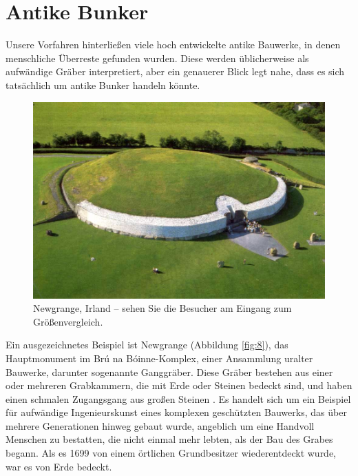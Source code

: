 \documentclass[10pt,twocolumn,letterpaper]{article}
\begin{document}
\section{Antike Bunker}

Unsere Vorfahren hinterließen viele hoch entwickelte antike Bauwerke, in denen menschliche Überreste gefunden wurden. Diese werden üblicherweise als aufwändige Gräber interpretiert, aber ein genauerer Blick legt nahe, dass es sich tatsächlich um antike Bunker handeln könnte.

\begin{figure}[b]
\begin{center}
   \includegraphics[width=1\linewidth]{ww19.jpg}
\end{center}
   \caption{Newgrange, Irland – sehen Sie die Besucher am Eingang zum Größenvergleich.}
\label{fig:8}
\label{fig:onecol}
\end{figure}

Ein ausgezeichnetes Beispiel ist Newgrange (Abbildung \ref{fig:8}), das Hauptmonument im Brú na Bóinne-Komplex, einer Ansammlung uralter Bauwerke, darunter sogenannte Ganggräber. Diese Gräber bestehen aus einer oder mehreren Grabkammern, die mit Erde oder Steinen bedeckt sind, und haben einen schmalen Zugangsgang aus großen Steinen \cite{70}. Es handelt sich um ein Beispiel für aufwändige Ingenieurskunst eines komplexen geschützten Bauwerks, das über mehrere Generationen hinweg gebaut wurde, angeblich um eine Handvoll Menschen zu bestatten, die nicht einmal mehr lebten, als der Bau des Grabes begann. Als es 1699 von einem örtlichen Grundbesitzer wiederentdeckt wurde, war es von Erde bedeckt.
\end{document}
